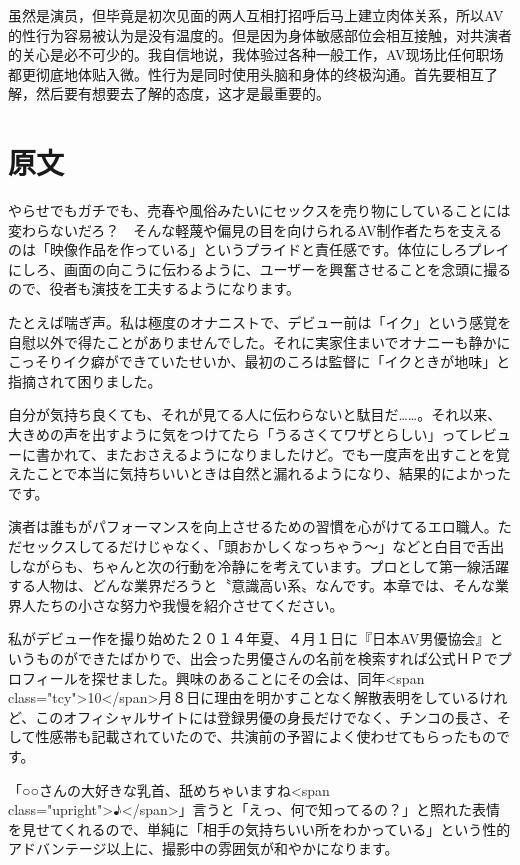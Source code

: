 \documentclass[12pt,UTF8]{ctexbook}
\begin{document}
虽然是演员，但毕竟是初次见面的两人互相打招呼后马上建立肉体关系，所以AV的性行为容易被认为是没有温度的。但是因为身体敏感部位会相互接触，对共演者的关心是必不可少的。我自信地说，我体验过各种一般工作，AV现场比任何职场都更彻底地体贴入微。性行为是同时使用头脑和身体的终极沟通。首先要相互了解，然后要有想要去了解的态度，这才是最重要的。

\switchcolumn

\section*{原文}

やらせでもガチでも、売春や風俗みたいにセックスを売り物にしていることには変わらないだろ？　そんな軽蔑や偏見の目を向けられるAV制作者たちを支えるのは「映像作品を作っている」というプライドと責任感です。体位にしろプレイにしろ、画面の向こうに伝わるように、ユーザーを興奮させることを念頭に撮るので、役者も演技を工夫するようになります。

たとえば喘ぎ声。私は極度のオナニストで、デビュー前は「イク」という感覚を自慰以外で得たことがありませんでした。それに実家住まいでオナニーも静かにこっそりイク癖ができていたせいか、最初のころは監督に「イクときが地味」と指摘されて困りました。

自分が気持ち良くても、それが見てる人に伝わらないと駄目だ……。それ以来、大きめの声を出すように気をつけてたら「うるさくてワザとらしい」ってレビューに書かれて、またおさえるようになりましたけど。でも一度声を出すことを覚えたことで本当に気持ちいいときは自然と漏れるようになり、結果的によかったです。

演者は誰もがパフォーマンスを向上させるための習慣を心がけてるエロ職人。ただセックスしてるだけじゃなく、「頭おかしくなっちゃう〜」などと白目で舌出しながらも、ちゃんと次の行動を冷静にを考えています。プロとして第一線活躍する人物は、どんな業界だろうと〝意識高い系〟なんです。本章では、そんな業界人たちの小さな努力や我慢を紹介させてください。

私がデビュー作を撮り始めた２０１４年夏、４月１日に『日本AV男優協会』というものができたばかりで、出会った男優さんの名前を検索すれば公式ＨＰでプロフィールを探せました。興味のあることにその会は、同年<span class="tcy">10</span>月８日に理由を明かすことなく解散表明をしているけれど、このオフィシャルサイトには登録男優の身長だけでなく、チンコの長さ、そして性感帯も記載されていたので、共演前の予習によく使わせてもらったものです。

「○○さんの大好きな乳首、舐めちゃいますね<span class="upright">♪</span>」言うと「えっ、何で知ってるの？」と照れた表情を見せてくれるので、単純に「相手の気持ちいい所をわかっている」という性的アドバンテージ以上に、撮影中の雰囲気が和やかになります。
\end{document}
